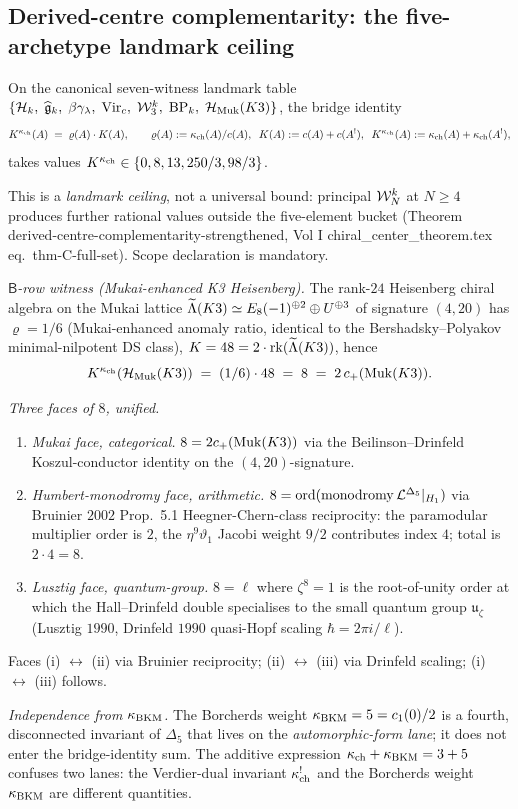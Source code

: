\subsection{Derived-centre complementarity: the five-archetype
landmark ceiling}
\label{wn:subsec:spine-complementarity}

\begin{theorem}
\label{wn:thm:spine-five-archetype}
On the canonical seven-witness landmark table
$\{\mathcal{H}_k,\; \widehat{\mathfrak{g}}_k,\; \beta\gamma_\lambda,\; \mathrm{Vir}_c,\;
\mathcal{W}_3^k,\; \mathrm{BP}_k,\; \mathcal{H}_{\mathrm{Muk}}(K3)\}$, the bridge identity
\[
K^{\kappa_{\mathrm{ch}}}(A) \;=\; \varrho(A) \cdot K(A),\qquad
\varrho(A) := \kappa_{\mathrm{ch}}(A)/c(A),\;\;
K(A) := c(A) + c(A^!),\;\;
K^{\kappa_{\mathrm{ch}}}(A) := \kappa_{\mathrm{ch}}(A) + \kappa_{\mathrm{ch}}(A^!),
\]
takes values
$K^{\kappa_{\mathrm{ch}}} \in \{0, 8, 13, 250/3, 98/3\}$.

This is a \emph{landmark ceiling}, not a universal bound: principal
$\mathcal{W}_N^k$ at $N \geq 4$ produces further rational values outside the
five-element bucket (Theorem derived-centre-complementarity-strengthened,
Vol I chiral\_center\_theorem.tex eq.~thm-C-full-set). Scope
declaration is mandatory.

\emph{$\mathsf{B}$-row witness (Mukai-enhanced K3 Heisenberg).} The
rank-$24$ Heisenberg chiral algebra on the Mukai lattice
$\widetilde{\Lambda}(K3) \simeq E_8(-1)^{\oplus 2} \oplus U^{\oplus 3}$ of signature
$(4, 20)$ has $\varrho = 1/6$ (Mukai-enhanced anomaly ratio, identical
to the Bershadsky--Polyakov minimal-nilpotent DS class), $K = 48 =
2 \cdot \mathrm{rk}(\widetilde{\Lambda}(K3))$, hence
\[
K^{\kappa_{\mathrm{ch}}}(\mathcal{H}_{\mathrm{Muk}}(K3)) \;=\; (1/6) \cdot 48 \;=\; 8
\;=\; 2\, c_+(\mathrm{Muk}(K3)).
\]

\emph{Three faces of $8$, unified.}
\begin{enumerate}[label=(\roman*)]
\item \emph{Mukai face, categorical.}
$8 = 2c_+(\mathrm{Muk}(K3))$ via the Beilinson--Drinfeld Koszul-conductor
identity on the $(4, 20)$-signature.
\item \emph{Humbert-monodromy face, arithmetic.}
$8 = \mathrm{ord}(\mathrm{monodromy}\, \mathcal{L}^{\Delta_5}|_{H_1})$ via
Bruinier $2002$ Prop.~5.1 Heegner-Chern-class reciprocity: the
paramodular multiplier order is $2$, the $\eta^9\vartheta_1$ Jacobi
weight $9/2$ contributes index $4$; total is $2 \cdot 4 = 8$.
\item \emph{Lusztig face, quantum-group.}
$8 = \ell$ where $\zeta^8 = 1$ is the root-of-unity order at which the
Hall--Drinfeld double specialises to the small quantum group
$\mathfrak{u}_\zeta$ (Lusztig $1990$, Drinfeld $1990$ quasi-Hopf scaling
$\hbar = 2\pi i/\ell$).
\end{enumerate}
Faces (i) $\leftrightarrow$ (ii) via Bruinier reciprocity; (ii)
$\leftrightarrow$ (iii) via Drinfeld scaling; (i) $\leftrightarrow$
(iii) follows.

\emph{Independence from $\kappa_{\mathrm{BKM}}$.} The Borcherds weight $\kappa_{\mathrm{BKM}} =
5 = c_1(0)/2$ is a fourth, disconnected invariant of $\Delta_5$ that
lives on the \emph{automorphic-form lane}; it does not enter the
bridge-identity sum.  The additive expression
$\kappa_{\mathrm{ch}}+\kappa_{\mathrm{BKM}}=3+5$ confuses two lanes: the Verdier-dual invariant
$\kappa_{\mathrm{ch}}^!$ and the Borcherds weight $\kappa_{\mathrm{BKM}}$ are different quantities.
\end{theorem}
